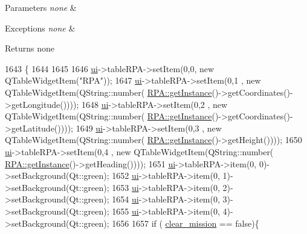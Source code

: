 \begin{DoxyParams}{Parameters}
{\em none} & \\
\hline
\end{DoxyParams}

\begin{DoxyExceptions}{Exceptions}
{\em none} & \\
\hline
\end{DoxyExceptions}
\begin{DoxyReturn}{Returns}
none 
\end{DoxyReturn}

\begin{DoxyCode}
1643                        \{
1644 
1645 
1646     \hyperlink{a00008_a6dc041ef6a2ffb329928d2913e8344e6}{ui}->tableRPA->setItem(0,0,  \textcolor{keyword}{new} QTableWidgetItem(\textcolor{stringliteral}{"RPA"}));
1647     \hyperlink{a00008_a6dc041ef6a2ffb329928d2913e8344e6}{ui}->tableRPA->setItem(0,1 , \textcolor{keyword}{new} QTableWidgetItem(QString::number(
      \hyperlink{a00012_a40277d38c94caf6125045994ba06f18f}{RPA::getInstance}()->getCoordinates()->getLongitude())));
1648     \hyperlink{a00008_a6dc041ef6a2ffb329928d2913e8344e6}{ui}->tableRPA->setItem(0,2 , \textcolor{keyword}{new} QTableWidgetItem(QString::number(
      \hyperlink{a00012_a40277d38c94caf6125045994ba06f18f}{RPA::getInstance}()->getCoordinates()->getLatitude())));
1649     \hyperlink{a00008_a6dc041ef6a2ffb329928d2913e8344e6}{ui}->tableRPA->setItem(0,3 , \textcolor{keyword}{new} QTableWidgetItem(QString::number(
      \hyperlink{a00012_a40277d38c94caf6125045994ba06f18f}{RPA::getInstance}()->getHeight())));
1650     \hyperlink{a00008_a6dc041ef6a2ffb329928d2913e8344e6}{ui}->tableRPA->setItem(0,4 , \textcolor{keyword}{new} QTableWidgetItem(QString::number(
      \hyperlink{a00012_a40277d38c94caf6125045994ba06f18f}{RPA::getInstance}()->getHeading())));
1651     \hyperlink{a00008_a6dc041ef6a2ffb329928d2913e8344e6}{ui}->tableRPA->item(0, 0)->setBackground(Qt::green);
1652     \hyperlink{a00008_a6dc041ef6a2ffb329928d2913e8344e6}{ui}->tableRPA->item(0, 1)->setBackground(Qt::green);
1653     \hyperlink{a00008_a6dc041ef6a2ffb329928d2913e8344e6}{ui}->tableRPA->item(0, 2)->setBackground(Qt::green);
1654     \hyperlink{a00008_a6dc041ef6a2ffb329928d2913e8344e6}{ui}->tableRPA->item(0, 3)->setBackground(Qt::green);
1655     \hyperlink{a00008_a6dc041ef6a2ffb329928d2913e8344e6}{ui}->tableRPA->item(0, 4)->setBackground(Qt::green);
1656 
1657     \textcolor{keywordflow}{if} ( \hyperlink{a00008_a4ea0f7bc01af5b4359d7be6998600e13}{clear\_mission} == \textcolor{keyword}{false})\{

\end{DoxyCode}

